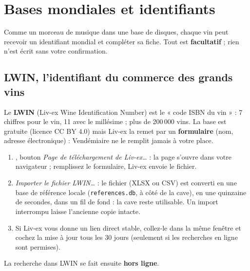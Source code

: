 \documentclass[11pt,a4paper]{article}
\begin{document}

\section{Bases mondiales et identifiants}
Comme un morceau de musique dans une base de disques, chaque vin peut recevoir un identifiant mondial et
compléter sa fiche. Tout est \textbf{facultatif} ; rien n'est écrit sans votre confirmation.

\subsection{LWIN, l'identifiant du commerce des grands vins}
Le \textbf{LWIN} (Liv-ex Wine Identification Number) est le « code ISBN du vin » : 7 chiffres pour le vin,
11 avec le millésime ; plus de 200\,000 vins. La base est gratuite (licence CC BY 4.0) mais Liv-ex la remet
par un \textbf{formulaire} (nom, adresse électronique) : Vendémiaire ne le remplit jamais à votre place.
\begin{enumerate}
  \item {}, bouton \emph{Page de téléchargement de Liv-ex…} :
        la page s'ouvre dans votre navigateur ; remplissez le formulaire, Liv-ex envoie le fichier.
  \item \emph{Importer le fichier LWIN…} : le fichier (XLSX ou CSV) est converti en une base de référence
        locale (\texttt{references.db}, à côté de la cave), en une quinzaine de secondes, dans un fil de fond :
        la cave reste utilisable. Un import interrompu laisse l'ancienne copie intacte.
  \item Si Liv-ex vous donne un lien direct stable, collez-le dans la même fenêtre et cochez la mise à jour
        tous les 30 jours (seulement si les recherches en ligne sont permises).
\end{enumerate}
La recherche dans LWIN se fait ensuite \textbf{hors ligne}.

\end{document}
